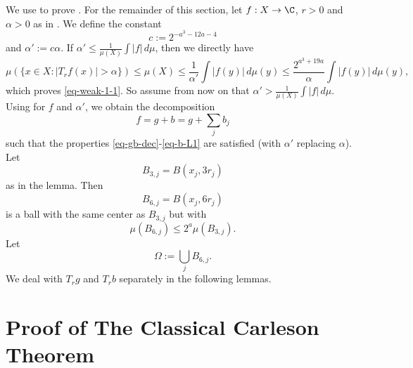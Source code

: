We use  to prove . For the remainder of this section, let $f:X\to\C$, $r>0$ and $\alpha>0$ as in .
We define the constant
\begin{equation} \label{weak-1-1-proof-cz-const}
    c:= 2^{-a^3-12a-4}
\end{equation}
and $\alpha' := c\alpha$. If $\alpha'\le\frac{1}{\mu(X)}\int |f|\,d\mu$, then we directly have
\begin{equation*}
    \mu\left(\{x\in X: |T_r f(x)|>\alpha\}\right)\le \mu(X) \le \frac{1}{\alpha'} \int |f(y)|\, d\mu(y)
    \le \frac{2^{a^3 + 19a}}{\alpha} \int |f(y)|\, d\mu(y),
\end{equation*}
which proves \eqref{eq-weak-1-1}.
So assume from now on that $\alpha'>\frac{1}{\mu(X)}\int |f|\,d\mu$.
Using  for $f$ and $\alpha'$, we obtain the decomposition
\begin{equation*}
    f=g+b=g+\sum_j b_j
\end{equation*}
such that the properties \eqref{eq-gb-dec}-\eqref{eq-b-L1} are satisfied (with $\alpha'$ replacing $\alpha$). Let
\begin{equation}
    \label{eq-Ij-cj}
    B_{3,j}=B(x_j, 3r_j)
\end{equation}
as in the lemma. Then
\begin{equation}
    \label{eq-Ij*}
    B_{6,j}=B(x_j, 6r_j)
\end{equation}
is a ball with the same center as $B_{3,j}$ but with
\begin{equation}
    \label{eq-Ij*-dim}
    \mu(B_{6,j})\le 2^{a} \mu(B_{3,j}).
\end{equation}
Let
\begin{equation}
    \label{eq-omega}
    \Omega:=\bigcup_j B_{6,j}.
\end{equation}
We deal with $T_rg$ and $T_rb$ separately in the following lemmas.

















\section{Proof of The Classical Carleson Theorem}

